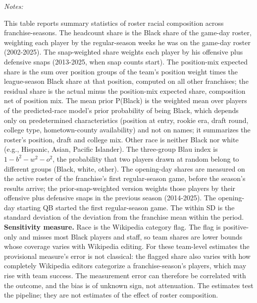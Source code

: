\begin{table}[!h]
{\begin{threeparttable}
\begin{tabular}[t]{lrrrrrrrr}
\bottomrule
\end{tabular}
\begin{tablenotes}[para]
\item \textit{Notes:} 
\item This table reports summary statistics of roster racial composition across franchise-seasons. The headcount share is the Black share of the game-day roster, weighting each player by the regular-season weeks he was on the game-day roster (2002-2025). The snap-weighted share weights each player by his offensive plus defensive snaps (2013-2025, when snap counts start). The position-mix expected share is the sum over position groups of the team's position weight times the league-season Black share at that position, computed on all other franchises; the residual share is the actual minus the position-mix expected share, composition net of position mix. The mean prior P(Black) is the weighted mean over players of the predicted-race model's prior probability of being Black, which depends only on predetermined characteristics (position at entry, rookie era, draft round, college type, hometown-county availability) and not on names; it summarizes the roster's position, draft and college mix. Other race is neither Black nor white (e.g., Hispanic, Asian, Pacific Islander). The three-group Blau index is $1 - b^2 - w^2 - o^2$, the probability that two players drawn at random belong to different groups (Black, white, other). The opening-day shares are measured on the active roster of the franchise's first regular-season game, before the season's results arrive; the prior-snap-weighted version weights those players by their offensive plus defensive snaps in the previous season (2014-2025). The opening-day starting QB started the first regular-season game. The within SD is the standard deviation of the deviation from the franchise mean within the period. \textbf{Sensitivity measure.} Race is the Wikipedia category flag. The flag is positive-only and misses most Black players and staff, so team shares are lower bounds whose coverage varies with Wikipedia editing. For these team-level estimates the provisional measure's error is not classical: the flagged share also varies with how completely Wikipedia editors categorize a franchise-season's players, which may rise with team success. The measurement error can therefore be correlated with the outcome, and the bias is of unknown sign, not attenuation. The estimates test the pipeline; they are not estimates of the effect of roster composition.
\end{tablenotes}
\end{threeparttable}}
\end{table}
